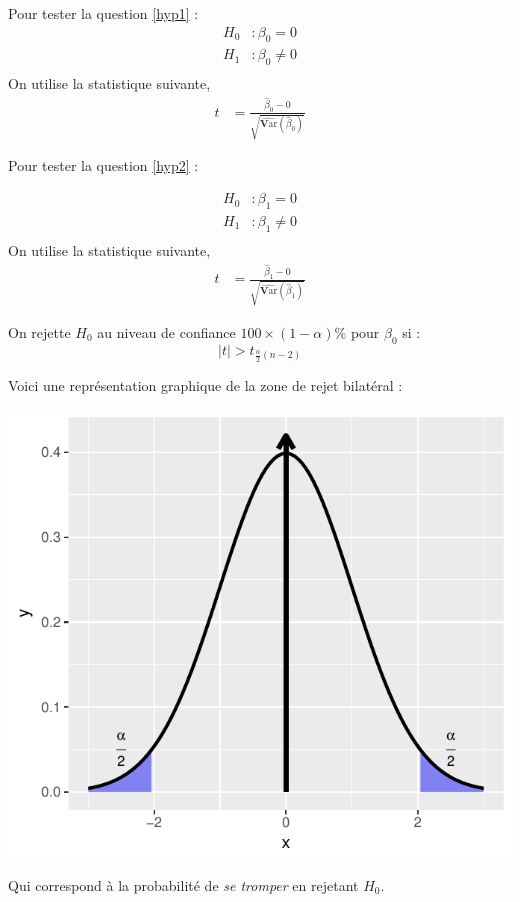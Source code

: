 \documentclass[11pt,french]{report}
\newcommand{\Var}{\mathrm{\textbf{V}ar}}
\begin{document}
Pour tester la question \ref{hyp1} :
\begin{align*}
H_0 &: \beta_0 = 0 \\
H_1 &: \beta_0 \neq 0 \\
\end{align*}
On utilise la statistique suivante,
\begin{align*}
t &= \frac{\hat{\beta}_0 - 0 }{\sqrt{\widehat{\Var}(\hat{\beta}_0)}}
\end{align*}

Pour tester la question  \ref{hyp2} :

\begin{align*}
H_0 &: \beta_1 = 0 \\
H_1 &: \beta_1 \neq 0 \\
\end{align*}
On utilise la statistique suivante,
\begin{align*}
t &= \frac{\hat{\beta}_1 - 0 }{\sqrt{\widehat{\Var}(\hat{\beta}_1)}}
\end{align*}

On rejette $H_0$ au niveau de confiance $100 \times (1 - \alpha)\%$ pour $\beta_0$ si :
$$
|t| > t_{\frac{\alpha}{2}(n-2)}
$$

Voici une représentation graphique de la zone de rejet bilatéral :

\includegraphics{notes_de_cours-015}

Qui correspond à la probabilité de \emph{se tromper} en rejetant $H_0$.
\end{document}

